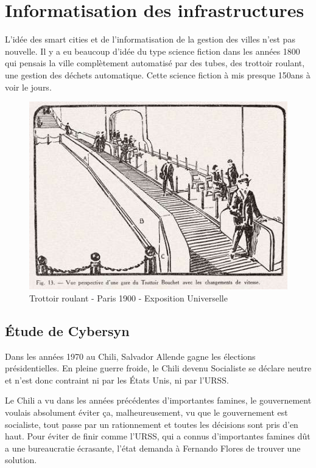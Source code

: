 \chapter{Informatisation des infrastructures}

L'idée des smart cities et de l'informatisation de la gestion des villes n'est pas nouvelle.
Il y a eu beaucoup d'idée du type science fiction dans les années 1800 qui pensais la ville
complètement automatisé par des tubes, des trottoir roulant, une gestion des déchets automatique.
Cette science fiction à mis presque 150ans à voir le jours.

\begin{figure}[h]
  \centering
  \includegraphics[scale=0.30]{media/trottoir_roulant.jpg}
  \caption{Trottoir roulant - Paris 1900 - Exposition Universelle}
\end{figure}

\section{Étude de Cybersyn}

Dans les années 1970 au Chili, Salvador Allende gagne les élections présidentielles.
En pleine guerre froide, le Chili devenu Socialiste se déclare neutre et n'est donc
contraint ni par les États Unis, ni par l'URSS.

Le Chili a vu dans les années précédentes d'importantes famines, le gouvernement voulais
absolument éviter ça, malheureusement, vu que le gouvernement est socialiste, tout passe
par un rationnement et toutes les décisions sont pris d'en haut.
Pour éviter de finir comme l'URSS, qui a connus d'importantes famines dût a une
bureaucratie écrasante, l'état demanda à Fernando Flores de trouver une solution.

